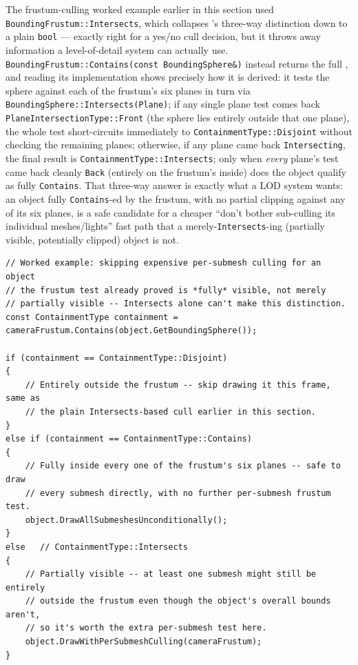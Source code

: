 The frustum-culling worked example earlier in this section used
\texttt{BoundingFrustum::Intersects}, which collapses 's three-way
distinction down to a plain \texttt{bool} --- exactly right for a yes/no cull decision, but it
throws away information a level-of-detail system can actually use.
\texttt{BoundingFrustum::Contains(const BoundingSphere\&)} instead returns the full
, and reading its implementation shows precisely how it is derived:
it tests the sphere against each of the frustum's six planes in turn via
\texttt{BoundingSphere::Intersects(Plane)}; if any single plane test comes back
\texttt{PlaneIntersectionType::Front} (the sphere lies entirely outside that one plane), the
whole test short-circuits immediately to \texttt{ContainmentType::Disjoint} without checking
the remaining planes; otherwise, if any plane came back \texttt{Intersecting}, the final
result is \texttt{ContainmentType::Intersects}; only when \emph{every} plane's test came back
cleanly \texttt{Back} (entirely on the frustum's inside) does the object qualify as fully
\texttt{Contains}. That three-way answer is exactly what a LOD system wants: an object fully
\texttt{Contains}-ed by the frustum, with no partial clipping against any of its six planes,
is a safe candidate for a cheaper ``don't bother sub-culling its individual meshes/lights''
fast path that a merely-\texttt{Intersects}-ing (partially visible, potentially clipped)
object is not.

\begin{lstlisting}
// Worked example: skipping expensive per-submesh culling for an object
// the frustum test already proved is *fully* visible, not merely
// partially visible -- Intersects alone can't make this distinction.
const ContainmentType containment = cameraFrustum.Contains(object.GetBoundingSphere());

if (containment == ContainmentType::Disjoint)
{
    // Entirely outside the frustum -- skip drawing it this frame, same as
    // the plain Intersects-based cull earlier in this section.
}
else if (containment == ContainmentType::Contains)
{
    // Fully inside every one of the frustum's six planes -- safe to draw
    // every submesh directly, with no further per-submesh frustum test.
    object.DrawAllSubmeshesUnconditionally();
}
else   // ContainmentType::Intersects
{
    // Partially visible -- at least one submesh might still be entirely
    // outside the frustum even though the object's overall bounds aren't,
    // so it's worth the extra per-submesh test here.
    object.DrawWithPerSubmeshCulling(cameraFrustum);
}
\end{lstlisting}

